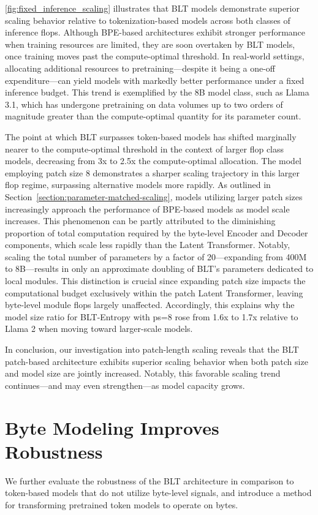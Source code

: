 \autoref{fig:fixed_inference_scaling} illustrates that {\textsc BLT} models demonstrate superior scaling behavior relative to tokenization-based models across both classes of inference flops. Although BPE-based architectures exhibit stronger performance when training resources are limited, they are soon overtaken by {\textsc BLT} models, once training moves past the compute-optimal threshold. In real-world settings, allocating additional resources to pretraining—despite it being a one-off expenditure—can yield models with markedly better performance under a fixed inference budget. This trend is exemplified by the 8B model class, such as Llama 3.1, which has undergone pretraining on data volumes up to two orders of magnitude greater than the compute-optimal quantity for its parameter count.

The point at which {\textsc BLT} surpasses token-based models has shifted marginally nearer to the compute-optimal threshold in the context of larger flop class models, decreasing from 3x to 2.5x the compute-optimal allocation. The model employing patch size 8 demonstrates a sharper scaling trajectory in this larger flop regime, surpassing alternative models more rapidly. As outlined in Section~\ref{section:parameter-matched-scaling}, models utilizing larger patch sizes increasingly approach the performance of BPE-based models as model scale increases. This phenomenon can be partly attributed to the diminishing proportion of total computation required by the byte-level Encoder and Decoder components, which scale less rapidly than the Latent Transformer. Notably, scaling the total number of parameters by a factor of 20—expanding from 400M to 8B—results in only an approximate doubling of {\textsc BLT}'s parameters dedicated to local modules. This distinction is crucial since expanding patch size impacts the computational budget exclusively within the patch Latent Transformer, leaving byte-level module flops largely unaffected. Accordingly, this explains why the model size ratio for {\textsc BLT}-Entropy with ps=8 rose from 1.6x to 1.7x relative to Llama 2 when moving toward larger-scale models.

In conclusion, our investigation into patch-length scaling reveals that the {\textsc BLT} patch-based architecture exhibits superior scaling behavior when both patch size and model size are jointly increased. Notably, this favorable scaling trend continues—and may even strengthen—as model capacity grows.

\section{Byte Modeling Improves Robustness} We further evaluate the robustness of the {\textsc BLT} architecture in comparison to token-based models that do not utilize byte-level signals, and introduce a method for transforming pretrained token models to operate on bytes.
\label{sec:robustness}

